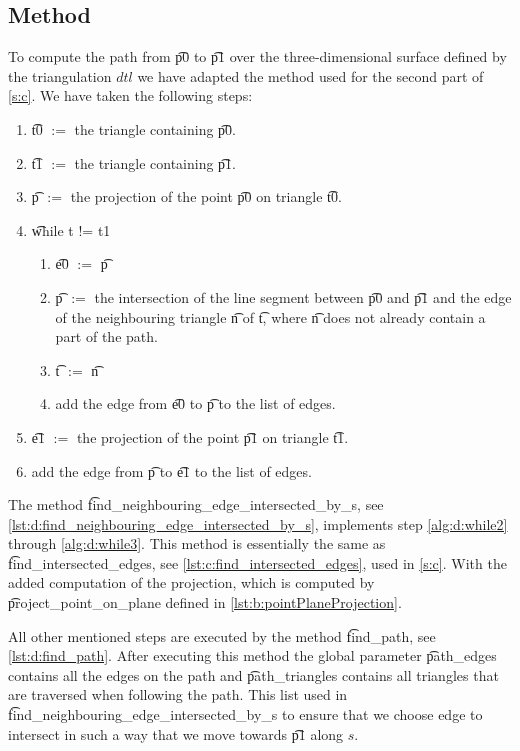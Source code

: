 \subsection*{Method}
	To compute the path from \t{p0} to \t{p1} over the three-dimensional surface defined by the triangulation $dtl$ we have adapted the method used for the second part of \autoref{s:c}. We have taken the following steps:
	\begin{enumerate}
		\item \label{alg:d:1} \t{t0} $:=$ the triangle containing \t{p0}.
		\item \label{alg:d:2} \t{t1} $:=$ the triangle containing \t{p1}.
		\item \label{alg:d:3} \t{p} $:=$ the projection of the point \t{p0} on triangle \t{t0}.
		\item \label{alg:d:4} \t{while t != t1}
			\begin{enumerate}
				\item \label{alg:d:while1} \t{e0} $:=$ \t{p}
				\item \label{alg:d:while2} \t{p} $:=$ the intersection of the line segment between \t{p0} and \t{p1} and the edge of the neighbouring triangle \t{n} of \t{t}, where \t{n} does not already contain a part of the path.
				\item \label{alg:d:while3} \t{t} $:=$ \t{n}
				\item \label{alg:d:while4} add the edge from \t{e0} to \t{p} to the list of edges.
			\end{enumerate}
		\item \label{alg:d:5} \t{e1} $:=$ the projection of the point \t{p1} on triangle \t{t1}.
		\item \label{alg:d:6} add the edge from \t{p} to \t{e1} to the list of edges.
	\end{enumerate}

	The method \t{find_neighbouring_edge_intersected_by_s}, see \autoref{lst:d:find_neighbouring_edge_intersected_by_s}, implements step \autoref{alg:d:while2} through \autoref{alg:d:while3}. This method is essentially the same as \t{find_intersected_edges}, see \autoref{lst:c:find_intersected_edges}, used in \autoref{s:c}. With the added computation of the projection, which is computed by \t{project_point_on_plane} defined in \autoref{lst:b:pointPlaneProjection}.

	All other mentioned steps are executed by the method \t{find_path}, see \autoref{lst:d:find_path}. After executing this method the global parameter \t{path_edges} contains all the edges on the path and \t{path_triangles} contains all triangles that are traversed when following the path. This list used in \t{find_neighbouring_edge_intersected_by_s} to ensure that we choose edge to intersect in such a way that we move towards \t{p1} along $s$. 

